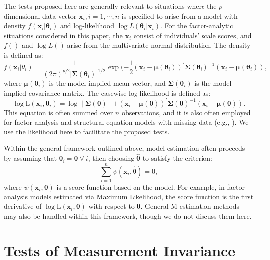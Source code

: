 \documentclass[man]{apa}
\begin{document}
The tests proposed here are generally relevant to situations where the
$p$-dimensional 
data vector $\bm{x}_i, i=1,\cdots,n$ is specified to arise from a model with
density $f(\bm{x}_i | \bm{\theta}_i)$ and log-likelihood 
$\log L(\bm{\theta}_i | \bm{x}_i)$.  
For the factor-analytic situations
considered in this paper, the $\bm{x}_i$ consist of individuals' scale
scores, and 
$f()$ and $\log L()$ arise from the multivariate normal distribution.
The density is defined as:
\begin{equation}
    \label{eq:mvndensity}
    f(\bm{x}_i | \theta_i) = \frac{1}{(2\pi)^{p/2} |
      \bm{\Sigma}(\bm{\theta}_i) |^{1/2}}\exp(-\frac{1}{2}(\bm{x}_i -
    \bm{\mu}(\bm{\theta}_i))^{\prime} \bm{\Sigma}(\bm{\theta}_i)^{-1} (\bm{x}_i -
    \bm{\mu}(\bm{\theta}_i)),
\end{equation}
where ${\bm{\mu}}({\bm{\theta}}_i)$ is the
model-implied mean vector, and ${\bm{\Sigma}}({\bm{\theta}}_i)$ is the
model-implied covariance matrix.
The casewise log-likelihood is defined as:
\begin{equation}
    \label{eq:caselik}
    \log \text{L}({\bm{x}}_i, {\bm{\theta}}_i) = %
\log \mid 
\bm{\Sigma}(\bm{\theta}) \mid + %
(\bm{x}_i -
\bm{\mu}(\bm{\theta}))^{\prime} \bm{\Sigma}(\bm{\theta})^{-1} (\bm{x}_i -
\bm{\mu}(\bm{\theta})).
\end{equation}
This equation is often summed over $n$ observations, and it is also
often employed for factor analysis and structural
equation models with missing data (e.g., ).  We use
the likelihood here to facilitate the proposed tests.

Within the general framework outlined above, model estimation
often proceeds by assuming that $\bm{\theta}_i = \bm{\theta}\
\forall\ i$, then choosing $\hat{\bm{\theta}}$ to satisfy the
criterion:
\begin{equation}
    \label{eq:score}
  \sum_{i=1}^{n} \psi(\bm{x}_i, \hat{\bm{\theta}}) = 0,    
\end{equation}
 where $\psi(\bm{x}_i, \bm{\theta})$ 
is a score function based on the model.  
For example, in factor analysis models estimated via Maximum
Likelihood, the score function is the first derivative of $\log
\text{L}(\bm{x}_i, \bm{\theta})$ with respect to $\bm{\theta}$.
General M-estimation methods may also be handled within this
framework, though we do not discuss them here.

\section{Tests of Measurement Invariance}
\end{document}
